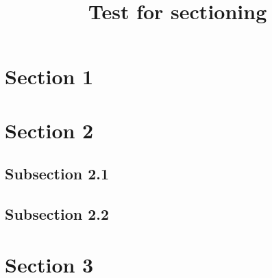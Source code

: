 \usepackage{blindtext}

\title{Test for sectioning}
\author{}
\date{}

\usepackage{calc}
\usepackage{longtable}
\usepackage{tabu}
\usepackage{breqn}
\setlength{\arraycolsep}{0.800000em}
\renewcommand{\arraystretch}{1.400000}

\renewcommand{\baselinestretch}{1.250000}
\selectfont
\setlength{\parskip}{1.0\baselineskip}


\maketitle
\tableofcontents



\blindtext

\section{Section 1}

\blindtext

\section{Section 2}

\subsection{Subsection 2.1}

\blindtext

\subsection{Subsection 2.2}

\blindtext

\section{Section 3}

